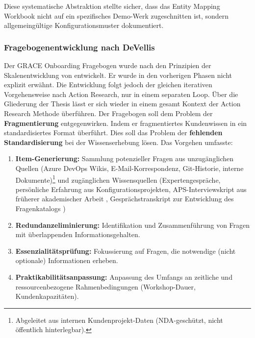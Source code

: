\noindent Diese systematische Abstraktion stellte sicher, dass das Entity Mapping Workbook nicht auf ein spezifisches Demo-Werk zugeschnitten ist, sondern allgemeingültige Konfigurationsmuster dokumentiert.

\subsubsection{Fragebogenentwicklung nach DeVellis}
\label{subsubsec:Fragebogenentwicklung}

Der GRACE Onboarding Fragebogen wurde nach den Prinzipien der Skalenentwicklung von \cite{devellis:scale_development2017} entwickelt. Er wurde in den vorherigen Phasen nicht explizit erwähnt. Die Entwicklung folgt jedoch der gleichen iterativen Vorgehensweise nach Action Research, nur in einem separaten Loop. Über die Gliederung der Thesis lässt er sich wieder in einem gesamt Kontext der Action Research Methode überführen. Der Fragebogen soll dem Problem der \textbf{Fragmentierung} entgegenwirken. Indem er fragmentiertes Kundenwissen in ein standardisiertes Format überführt. Dies soll das Problem der \textbf{fehlenden Standardisierung} bei der Wissenserhebung lösen. Das Vorgehen umfasste:

\begin{enumerate}
      \item \textbf{Item-Generierung:} Sammlung potenzieller Fragen aus unzugänglichen Quellen (Azure DevOps Wikis, E-Mail-Korrespondenz,
      Git-Historie, interne Dokumente)\footnote{Abgeleitet aus internen Kundenprojekt-Daten (NDA-geschützt, nicht öffentlich
      hinterlegbar).} und zugänglichen Wissensquellen (Expertengespräche, persönliche Erfahrung aus Konfigurationsprojekten, APS-Interviewskript aus
      früherer akademischer Arbeit \citep{grace:interviewskript2024}, Gesprächstranskript zur Entwicklung des Fragenkatalogs \citep{grace:gespraechstranskript_fragenkatalog2025})

    \item \textbf{Redundanzeliminierung:} Identifikation und Zusammenführung von Fragen mit überlappenden Informationsgehalten.

    \item \textbf{Essenzialitätsprüfung:} Fokussierung auf Fragen, die notwendige (nicht optionale) Informationen erheben.

    \item \textbf{Praktikabilitätsanpassung:} Anpassung des Umfangs an zeitliche und ressourcenbezogene Rahmenbedingungen (Workshop-Dauer, Kundenkapazitäten).
\end{enumerate}

